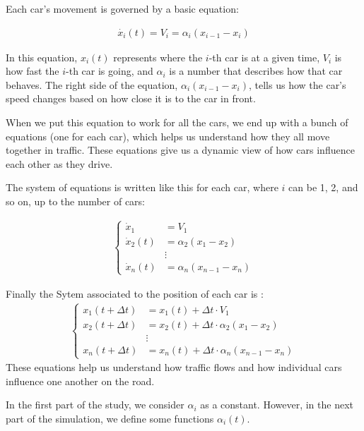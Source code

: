 \documentclass{article}
\begin{document}
			Each car's movement is governed by a basic equation:
			
			\begin{align*}
				\dot{x_i}(t) = V_i = \alpha_i(x_{i-1} - x_i)
			\end{align*}
			
			In this equation, \(x_i(t)\) represents where the \(i\)-th car is at a given time, \(V_i\) is how fast the \(i\)-th car is going, and \(\alpha_i\) is a number that describes how that car behaves. The right side of the equation, \(\alpha_i(x_{i-1} - x_i)\), tells us how the car's speed changes based on how close it is to the car in front.
			
			When we put this equation to work for all the cars, we end up with a bunch of equations (one for each car), which helps us understand how they all move together in traffic. These equations give us a dynamic view of how cars influence each other as they drive.
			
			The system of equations is written like this for each car, where \(i\) can be 1, 2, and so on, up to the number of cars:
			
			\begin{align*}
				\left\{
				\begin{array}{ll}
					\dot{x}_1 &= V_1 \\
					\dot{x}_2(t) &= \alpha_2(x_1 - x_2) \\
					&\vdots \\
					\dot{x}_n(t) &= \alpha_n(x_{n-1} - x_n)
				\end{array}
				\right.
			\end{align*}
			
			
			Finally the Sytem associated to the position of each car is : 
			\begin{align*}
				\left\{
				\begin{array}{ll}
					x_1(t + \Delta t) &= x_1(t) + \Delta t  \cdot V_1\\
					x_2(t + \Delta t) &= x_2(t) + \Delta t  \cdot \alpha_2(x_1 - x_2) \\
					&\vdots \\
					x_n(t + \Delta t) &= x_n(t) + \Delta t \cdot  \alpha_n(x_{n-1} - x_n)
				\end{array}
				\right.
			\end{align*}
			These equations help us understand how traffic flows and how individual cars influence one another on the road.
			
			In the first part of the study, we consider $\alpha_i$ as a constant. However, in the next part of the simulation, we define some functions $\alpha_i(t)$.
			
\end{document}
